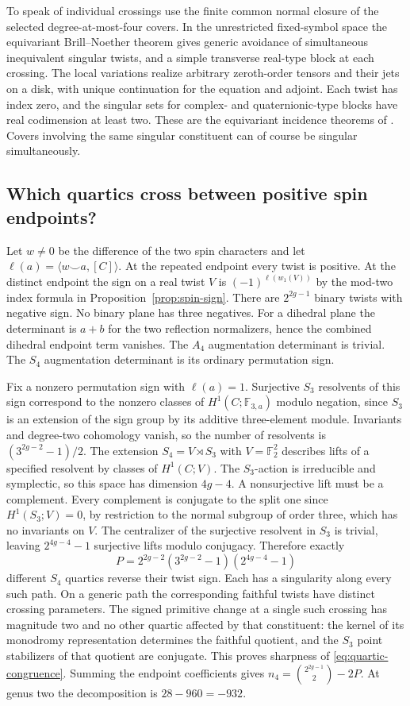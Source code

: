 To speak of individual crossings use the finite common normal closure of the selected degree-at-most-four covers. In the unrestricted fixed-symbol space the equivariant Brill--Noether theorem gives generic avoidance of simultaneous inequivalent singular twists, and a simple transverse real-type block at each crossing. The local variations realize arbitrary zeroth-order tensors and their jets on a disk, with unique continuation for the equation and adjoint. Each twist has index zero, and the singular sets for complex- and quaternionic-type blocks have real codimension at least two. These are the equivariant incidence theorems of \cite{dwbn}. Covers involving the same singular constituent can of course be singular simultaneously.

\subsection{Which quartics cross between positive spin endpoints?}

Let \(w\ne0\) be the difference of the two spin characters and let \(\ell(a)=\langle w\smile a,[C]\rangle\). At the repeated endpoint every twist is positive. At the distinct endpoint the sign on a real twist \(V\) is \((-1)^{\ell(w_1(V))}\) by the mod-two index formula in Proposition~\ref{prop:spin-sign}. There are \(2^{2g-1}\) binary twists with negative sign. No binary plane has three negatives. For a dihedral plane the determinant is \(a+b\) for the two reflection normalizers, hence the combined dihedral endpoint term vanishes. The \(A_4\) augmentation determinant is trivial. The \(S_4\) augmentation determinant is its ordinary permutation sign.

Fix a nonzero permutation sign with \(\ell(a)=1\). Surjective \(S_3\) resolvents of this sign correspond to the nonzero classes of \(H^1(C;\mathbb F_{3,a})\) modulo negation, since \(S_3\) is an extension of the sign group by its additive three-element module. Invariants and degree-two cohomology vanish, so the number of resolvents is \((3^{2g-2}-1)/2\). The extension \(S_4=V\rtimes S_3\) with \(V=\mathbb F_2^2\) describes lifts of a specified resolvent by classes of \(H^1(C;V)\). The \(S_3\)-action is irreducible and symplectic, so this space has dimension \(4g-4\). A nonsurjective lift must be a complement. Every complement is conjugate to the split one since \(H^1(S_3;V)=0\), by restriction to the normal subgroup of order three, which has no invariants on \(V\). The centralizer of the surjective resolvent in \(S_3\) is trivial, leaving \(2^{4g-4}-1\) surjective lifts modulo conjugacy. Therefore exactly
\[P=2^{2g-2}(3^{2g-2}-1)(2^{4g-4}-1)\]
different \(S_4\) quartics reverse their twist sign. Each has a singularity along every such path. On a generic path the corresponding faithful twists have distinct crossing parameters. The signed primitive change at a single such crossing has magnitude two and no other quartic affected by that constituent: the kernel of its monodromy representation determines the faithful quotient, and the \(S_3\) point stabilizers of that quotient are conjugate. This proves sharpness of \eqref{eq:quartic-congruence}. Summing the endpoint coefficients gives \(n_4=\binom{2^{2g-1}}2-2P\). At genus two the decomposition is \(28-960=-932\).

